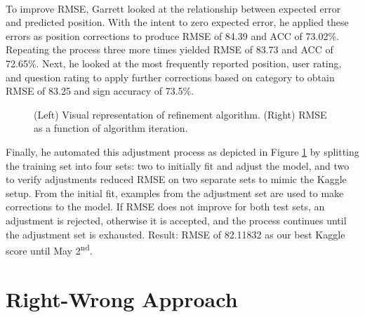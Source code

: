 \documentclass[letterpaper]{article}
\begin{document}
\paragraph{} To improve RMSE, Garrett looked at the relationship between expected error and predicted position. With the intent to zero expected error, he applied these errors as position corrections to produce RMSE of 84.39 and ACC of 73.02\%. Repeating the process three more times yielded RMSE of 83.73 and ACC of 72.65\%. Next, he looked at the most frequently reported position, user rating, and question rating to apply further corrections based on category to obtain RMSE of 83.25 and sign accuracy of 73.5\%.

\begin{figure}[H]
	\begin{center}
	\end{center}
	\caption{(Left) Visual representation of refinement algorithm. (Right) RMSE as a function of algorithm iteration.}
	\label{fig:expectedValue:refinement}
\end{figure}

Finally, he automated this adjustment process as depicted in Figure \ref{fig:expectedValue:refinement} by splitting the training set into four sets: two to initially fit and adjust the model, and two to verify adjustments reduced RMSE on two separate sets to mimic the Kaggle setup. From the initial fit, examples from the adjustment set are used to make corrections to the model. If RMSE does not improve for both test sets, an adjustment is rejected, otherwise it is accepted, and the process continues until the adjustment set is exhausted. Result: RMSE of 82.11832 as our best Kaggle score until May 2\textsuperscript{nd}.

\section{Right-Wrong Approach}
\end{document}

